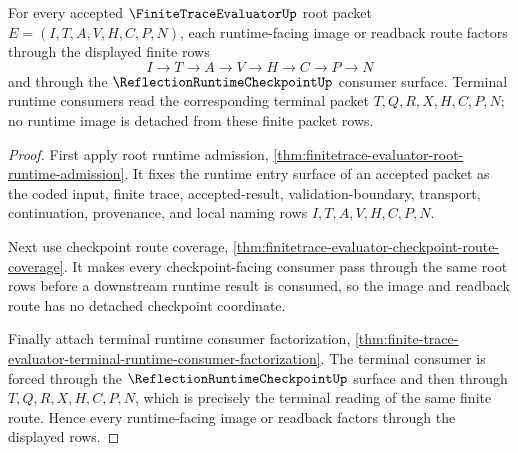 \begin{theorem}
\label{thm:finitetrace-evaluator-runtime-image-totality}
For every accepted $\FiniteTraceEvaluatorUp$ root packet
$E=(I,T,A,V,H,C,P,N)$, each runtime-facing image or readback route factors
through the displayed finite rows
$$
I \to T \to A \to V \to H \to C \to P \to N
$$
and through the $\ReflectionRuntimeCheckpointUp$ consumer surface. Terminal
runtime consumers read the corresponding terminal packet $T,Q,R,X,H,C,P,N$;
no runtime image is detached from these finite packet rows.
\end{theorem}
\begin{proof}
First apply root runtime admission,
\autoref{thm:finitetrace-evaluator-root-runtime-admission}. It fixes the
runtime entry surface of an accepted packet as the coded input, finite trace,
accepted-result, validation-boundary, transport, continuation, provenance, and
local naming rows $I,T,A,V,H,C,P,N$.

Next use checkpoint route coverage,
\autoref{thm:finitetrace-evaluator-checkpoint-route-coverage}. It makes every
checkpoint-facing consumer pass through the same root rows before a downstream
runtime result is consumed, so the image and readback route has no detached
checkpoint coordinate.

Finally attach terminal runtime consumer factorization,
\autoref{thm:finite-trace-evaluator-terminal-runtime-consumer-factorization}.
The terminal consumer is forced through the
$\ReflectionRuntimeCheckpointUp$ surface and then through $T,Q,R,X,H,C,P,N$,
which is precisely the terminal reading of the same finite route. Hence every
runtime-facing image or readback factors through the displayed rows.
\end{proof}

